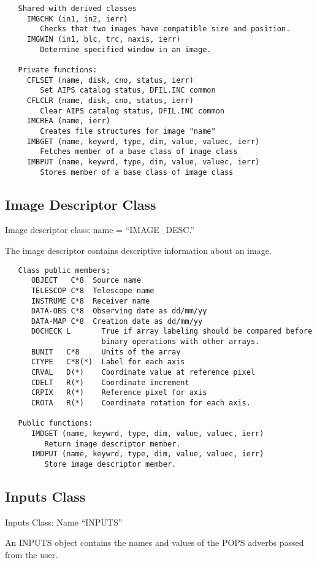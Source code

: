 {\begin{verbatim}
   Shared with derived classes
     IMGCHK (in1, in2, ierr)
        Checks that two images have compatible size and position.
     IMGWIN (in1, blc, trc, naxis, ierr)
        Determine specified window in an image.

   Private functions:
     CFLSET (name, disk, cno, status, ierr)
        Set AIPS catalog status, DFIL.INC common
     CFLCLR (name, disk, cno, status, ierr)
        Clear AIPS catalog status, DFIL.INC common
     IMCREA (name, ierr)
        Creates file structures for image "name"
     IMBGET (name, keywrd, type, dim, value, valuec, ierr)
        Fetches member of a base class of image class
     IMBPUT (name, keywrd, type, dim, value, valuec, ierr)
        Stores member of a base class of image class
\end{verbatim}}

\subsection{Image Descriptor Class}
   Image descriptor class:  name = ``IMAGE\_DESC.''

   The image descriptor contains descriptive information about an image.

{\small\begin{verbatim}
   Class public members;
      OBJECT   C*8  Source name
      TELESCOP C*8  Telescope name
      INSTRUME C*8  Receiver name
      DATA-OBS C*8  Observing date as dd/mm/yy
      DATA-MAP C*8  Creation date as dd/mm/yy
      DOCHECK L       True if array labeling should be compared before
                      binary operations with other arrays.
      BUNIT   C*8     Units of the array
      CTYPE   C*8(*)  Label for each axis
      CRVAL   D(*)    Coordinate value at reference pixel
      CDELT   R(*)    Coordinate increment
      CRPIX   R(*)    Reference pixel for axis
      CROTA   R(*)    Coordinate rotation for each axis.

   Public functions:
      IMDGET (name, keywrd, type, dim, value, valuec, ierr)
         Return image descriptor member.
      IMDPUT (name, keywrd, type, dim, value, valuec, ierr)
         Store image descriptor member.

\end{verbatim}}
\subsection{Inputs Class}
   Inputs Class: Name ``INPUTS''

   An INPUTS object contains the names and values of the POPS adverbs
passed from the user.


